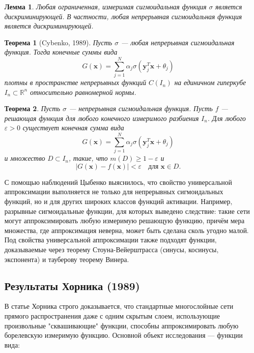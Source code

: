\documentclass[12pt]{article}
\newtheorem{theorem}{Теорема}
\newtheorem{lemma}{Лемма}
\begin{document}
	\begin{lemma}
		Любая ограниченная, измеримая сигмоидальная функция $\sigma$ является дискриминирующей. В частности, любая непрерывная сигмоидальная функция является дискриминирующей.
	\end{lemma}
	
	\begin{theorem}[Cybenko, 1989]
		Пусть $\sigma$ --- любая непрерывная сигмоидальная функция. Тогда конечные суммы вида
		\[
		G(\mathbf{x}) = \sum_{j=1}^N \alpha_j \sigma(\mathbf{y}_j^T\mathbf{x} + \theta_j)
		\]
		плотны в пространстве непрерывных функций $C(I_n)$ на единичном гиперкубе $I_n \subset \mathbb{R}^n$ относительно равномерной нормы.
	\end{theorem}
	
	\begin{theorem}
		Пусть $\sigma$ — непрерывная сигмоидальная функция. Пусть $f$ — решающая функция для любого конечного измеримого разбиения $I_n$. Для любого $\varepsilon > 0$ существует конечная сумма вида
		\[
		G(\mathbf{x}) = \sum_{j=1}^N \alpha_j \sigma(\mathbf{y}_j^T\mathbf{x} + \theta_j)
		\]
		и множество $D \subset I_n$, такие, что $m(D) \geq 1 - \varepsilon$ и
		\[
		|G(\mathbf{x}) - f(\mathbf{x})| < \varepsilon \quad \text{для } \mathbf{x} \in D.
		\]
	\end{theorem}
	
	С помощью наблюдений Цыбенко выяснилось, что свойство универсальной аппроксимации выполняется не только для непрерывных сигмоидальных функций, но и для других широких классов функций активации. Например, разрывные сигмоидальные функции, для которых выведено следствие: такие сети могут аппроксимировать любую измеримую решающую функцию, причём мера множества, где аппроксимация неверна, может быть сделана сколь угодно малой. Под свойства универсальной аппроксимации также подходят функции, доказываемые через теорему Стоуна-Вейерштрасса (синусы, косинусы, экспонента) и тауберову теорему Винера.
	
	\subsection{Результаты Хорника (1989)}
	
	В статье Хорника строго доказывается, что стандартные многослойные сети прямого распространения даже с одним скрытым слоем, использующие произвольные "сквашивающие" функции, способны аппроксимировать любую борелевскую измеримую функцию. Основной объект исследования — функции вида:
	
\end{document}
